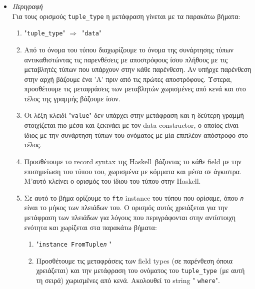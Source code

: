 \documentclass[diploma]{softlab-thesis}
\def\H{Haskell}
\def\lra{$\Longrightarrow$\ }
\begin{document}
\begin{itemize}
\begin{verbatim}
c0root :: a1 -> A'Tree a1 -> A'Tree a1
c0subtrees :: A'Trees a1 -> A'Tree a1 -> A'Tree a1
c0root = \new x -> x { root = new }
c0subtrees = \new x -> x { subtrees = new }
\end{verbatim}
\item
\textit{Περιγραφή}\\

Για τους ορισμούς \verb|tuple_type| η μετάφραση γίνεται με τα παρακάτω βήματα:

\begin{enumerate}

\item
"\verb|tuple_type|" \lra "\texttt{data}"

\item
Από το όνομα του τύπου διαχωρίζουμε το όνομα της συνάρτησης τύπων
αντικαθιστώντας τις παρενθέσεις με αποστρόφους ίσου πλήθους με τις μεταβλητές
τύπων που υπάρχουν στην κάθε παρένθεση. Αν υπήρχε παρένθεση στην αρχή βάζουμε
ένα 'A' πριν από τις πρώτες αποστρόφους. Ύστερα, προσθέτουμε τις μεταφράσεις
των μεταβλητών χωρισμένες από κενά και στο τέλος της γραμμής βάζουμε ίσον.

\item
Οι λέξη κλειδί "\texttt{value}" δεν υπάρχει στην μετάφραση και η δεύτερη
γραμμή στοιχίζεται πιο μέσα και ξεκινάει με τον data constructor, ο οποίος
είναι ίδιος με την συνάρτηση τύπων του ονόματος με μία επιπλέον απόστροφο στο
τέλος.

\item
Προσθέτουμε το record syntax της \H\ βάζοντας το κάθε field με την επισημείωση
του τύπου του, χωρισμένα με κόμματα και μέσα σε άγκιστρα.  Μ'αυτό κλείνει ο
ορισμός του ίδιου του τύπου στην \H.

\item
Σε αυτό το βήμα ορίζουμε το \texttt{ft\textit{n}} instance του τύπου που
ορίσαμε, όπου \texttt{\textit{n}} είναι το μήκος των πλειάδων του. Ο ορισμός
αυτός χρειάζεται για την μετάφραση των πλειάδων για λόγους που περιγράφονται
στην αντίστοιχη ενότητα και χωρίζεται στα παρακάτω βήματα:

\begin{enumerate}
\item
"\texttt{instance FromTuple}\texttt{\textit{n}} "

\item
Προσθέτουμε τις μεταφράσεις των field types (σε παρένθεση όποια χρειάζεται)
και την μετάφραση του ονόματος του \verb|tuple_type| (με αυτή τη σειρά)
χωρισμένες από κενά. Ακολουθεί το string " \texttt{where}".


\end{enumerate}
\end{enumerate}
\end{itemize}
\end{document}
